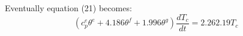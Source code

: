 Eventually equation (21) becomes:
\begin{equation}
(c_p^e \theta^e + 4.186 \theta^f + 1.996 \theta^g) \frac{dT_c}{dt} = 2.26  2.19 T_c 
\end{equation}
